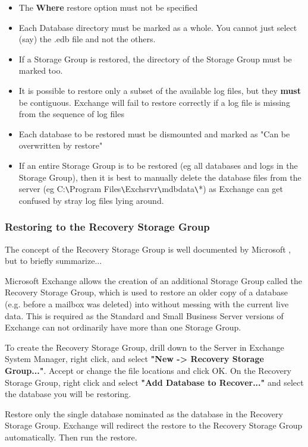 \begin{itemize}
\item  The {\bf Where} restore option must not be specified
\item Each Database directory must be marked as a whole. You cannot just
     select (say) the .edb file and not the others.
\item If a Storage Group is restored, the directory of the Storage Group
     must be marked too.
\item  It is possible to restore only a subset of the available log files,
     but they {\bf must} be contiguous. Exchange will fail to restore correctly
     if a log file is missing from the sequence of log files
\item Each database to be restored must be dismounted and marked as "Can be
    overwritten by restore"
\item If an entire Storage Group is to be restored (eg all databases and
   logs in the Storage Group), then it is best to manually delete the
   database files from the server (eg C:\verb+\+Program Files\verb+\+Exchsrvr\verb+\+mdbdata\verb+\+*)
   as Exchange can get confused by stray log files lying around.
\end{itemize}

\subsubsection{Restoring to the Recovery Storage Group}
The concept of the Recovery Storage Group is well documented by
Microsoft 
, 
but to briefly summarize...

Microsoft Exchange allows the creation of an additional Storage Group
called the Recovery Storage Group, which is used to restore an older
copy of a database (e.g. before a mailbox was deleted) into without
messing with the current live data. This is required as the Standard and
Small Business Server versions of Exchange can not ordinarily have more
than one Storage Group.

To create the Recovery Storage Group, drill down to the Server in Exchange
System Manager, right click, and select
{\bf "New -> Recovery Storage Group..."}.  Accept or change the file
locations and click OK. On the Recovery Storage Group, right click and
select {\bf "Add Database to Recover..."} and select the database you will
be restoring.

Restore only the single database nominated as the database in the
Recovery Storage Group. Exchange will redirect the restore to the
Recovery Storage Group automatically.
Then run the restore.

